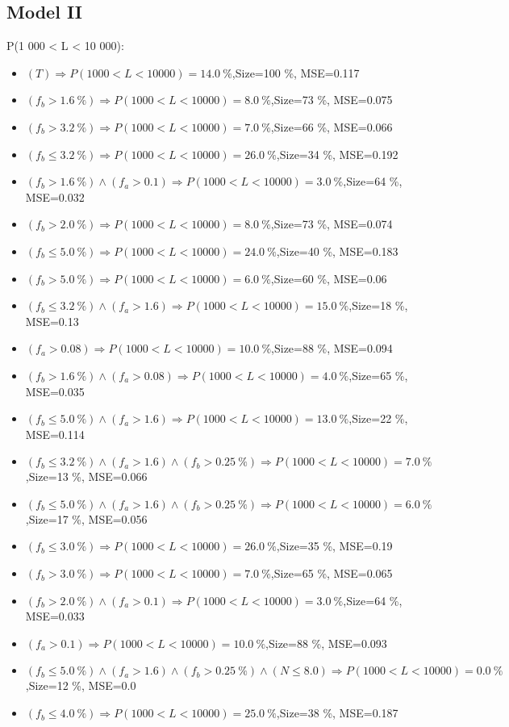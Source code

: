 \documentclass[numbered]{CSL}
\begin{document}
\subsection{Model II}
P(1 000 < L < 10 000):
\begin{itemize}
\item $(T) \Rightarrow P(1 000 < L < 10 000) = 14.0~\%$,\hfill Size=100 \%, MSE=0.117
\item $(f_b > 1.6~\%) \Rightarrow P(1 000 < L < 10 000) = 8.0~\%$,\hfill Size=73 \%, MSE=0.075
\item $(f_b > 3.2~\%) \Rightarrow P(1 000 < L < 10 000) = 7.0~\%$,\hfill Size=66 \%, MSE=0.066
\item $(f_b \leq 3.2~\%) \Rightarrow P(1 000 < L < 10 000) = 26.0~\%$,\hfill Size=34 \%, MSE=0.192
\item $(f_b > 1.6~\%) \land (f_a > 0.1) \Rightarrow P(1 000 < L < 10 000) = 3.0~\%$,\hfill Size=64 \%, MSE=0.032
\item $(f_b > 2.0~\%) \Rightarrow P(1 000 < L < 10 000) = 8.0~\%$,\hfill Size=73 \%, MSE=0.074
\item $(f_b \leq 5.0~\%) \Rightarrow P(1 000 < L < 10 000) = 24.0~\%$,\hfill Size=40 \%, MSE=0.183
\item $(f_b > 5.0~\%) \Rightarrow P(1 000 < L < 10 000) = 6.0~\%$,\hfill Size=60 \%, MSE=0.06
\item $(f_b \leq 3.2~\%) \land (f_a > 1.6) \Rightarrow P(1 000 < L < 10 000) = 15.0~\%$,\hfill Size=18 \%, MSE=0.13
\item $(f_a > 0.08) \Rightarrow P(1 000 < L < 10 000) = 10.0~\%$,\hfill Size=88 \%, MSE=0.094
\item $(f_b > 1.6~\%) \land (f_a > 0.08) \Rightarrow P(1 000 < L < 10 000) = 4.0~\%$,\hfill Size=65 \%, MSE=0.035
\item $(f_b \leq 5.0~\%) \land (f_a > 1.6) \Rightarrow P(1 000 < L < 10 000) = 13.0~\%$,\hfill Size=22 \%, MSE=0.114
\item $(f_b \leq 3.2~\%) \land (f_a > 1.6) \land (f_b > 0.25~\%) \Rightarrow P(1 000 < L < 10 000) = 7.0~\%$,\hfill Size=13 \%, MSE=0.066
\item $(f_b \leq 5.0~\%) \land (f_a > 1.6) \land (f_b > 0.25~\%) \Rightarrow P(1 000 < L < 10 000) = 6.0~\%$,\hfill Size=17 \%, MSE=0.056
\item $(f_b \leq 3.0~\%) \Rightarrow P(1 000 < L < 10 000) = 26.0~\%$,\hfill Size=35 \%, MSE=0.19
\item $(f_b > 3.0~\%) \Rightarrow P(1 000 < L < 10 000) = 7.0~\%$,\hfill Size=65 \%, MSE=0.065
\item $(f_b > 2.0~\%) \land (f_a > 0.1) \Rightarrow P(1 000 < L < 10 000) = 3.0~\%$,\hfill Size=64 \%, MSE=0.033
\item $(f_a > 0.1) \Rightarrow P(1 000 < L < 10 000) = 10.0~\%$,\hfill Size=88 \%, MSE=0.093
\item $(f_b \leq 5.0~\%) \land (f_a > 1.6) \land (f_b > 0.25~\%) \land (N \leq 8.0) \Rightarrow P(1 000 < L < 10 000) = 0.0~\%$,\hfill Size=12 \%, MSE=0.0
\item $(f_b \leq 4.0~\%) \Rightarrow P(1 000 < L < 10 000) = 25.0~\%$,\hfill Size=38 \%, MSE=0.187
\end{itemize}
\end{document}
